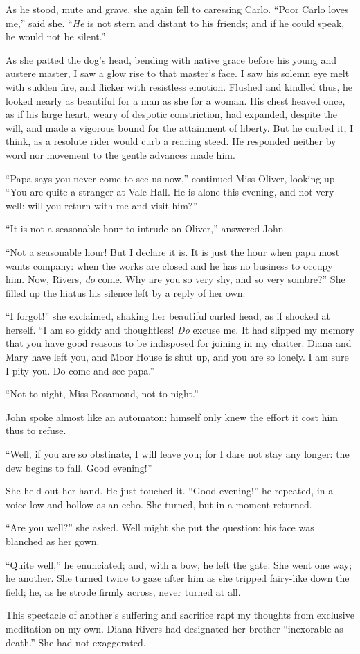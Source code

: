 As he stood, mute and grave, she again fell to caressing Carlo.
\enquote{Poor Carlo loves me,} said she. \enquote{\emph{He} is not stern and
	distant to his friends; and if he could speak, he would not be silent.}

As she patted the dog's head, bending with native grace before his young
and austere master, I saw a glow rise to that master's face. I saw his
solemn eye melt with sudden fire, and flicker with resistless emotion.
Flushed and kindled thus, he looked nearly as beautiful for a man as she
for a woman. His chest heaved once, as if his large heart, weary of
despotic constriction, had expanded, despite the will, and made a
vigorous bound for the attainment of liberty. But he curbed it, I
think, as a resolute rider would curb a rearing steed. He responded
neither by word nor movement to the gentle advances made him.

\enquote{Papa says you never come to see us now,} continued Miss Oliver,
looking up. \enquote{You are quite a stranger at Vale Hall. He is
	alone this evening, and not very well: will you return with me and visit
	him?}

\enquote{It is not a seasonable hour to intrude on \Mr{} Oliver,} answered
\St{} John.

\enquote{Not a seasonable hour! But I declare it is. It is just the hour when
	papa most wants company: when the works are closed and he has no
	business to occupy him. Now, \Mr{} Rivers, \emph{do} come. Why are you
	so very shy, and so very sombre?} She filled up the hiatus his silence
left by a reply of her own.

\enquote{I forgot!} she exclaimed, shaking her beautiful curled head, as
if shocked at herself. \enquote{I am so giddy and thoughtless! \emph{Do}
	excuse me. It had slipped my memory that you have good reasons to be
	indisposed for joining in my chatter. Diana and Mary have left you, and
	Moor House is shut up, and you are so lonely. I am sure I pity you. Do
	come and see papa.}

\enquote{Not to-night, Miss Rosamond, not to-night.}

\Mr{} \St{} John spoke almost like an automaton: himself only knew the
effort it cost him thus to refuse.

\enquote{Well, if you are so obstinate, I will leave you; for I dare not
	stay any longer: the dew begins to fall. Good evening!}

She held out her hand. He just touched it. \enquote{Good evening!} he
repeated, in a voice low and hollow as an echo. She turned, but in a
moment returned.

\enquote{Are you well?} she asked. Well might she put the question: his
face was blanched as her gown.

\enquote{Quite well,} he enunciated; and, with a bow, he left the gate.
She went one way; he another. She turned twice to gaze after him as she
tripped fairy-like down the field; he, as he strode firmly across, never
turned at all.

This spectacle of another's suffering and sacrifice rapt my thoughts
from exclusive meditation on my own. Diana Rivers had designated her
brother \enquote{inexorable as death.} She had not exaggerated.
